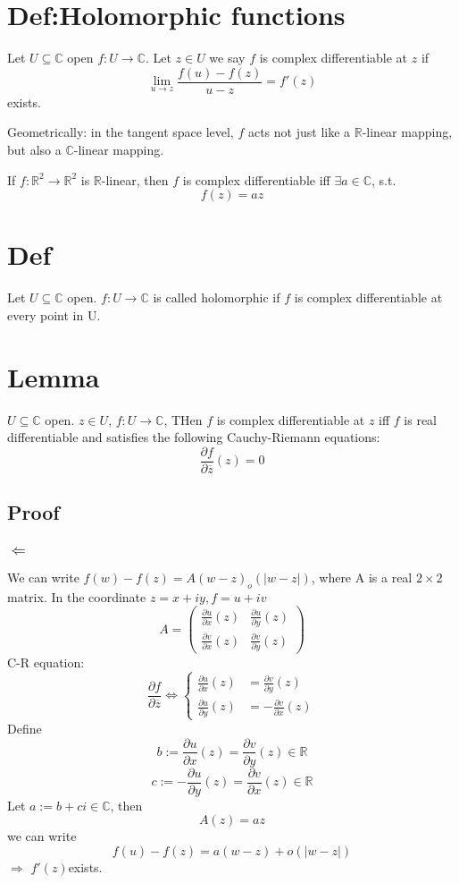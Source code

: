 \documentclass{book}
\newcommand{\abs}[1]{\left\lvert #1 \right\rvert}
\begin{document}
\section{Def:Holomorphic functions}
Let $U\subseteq \mathbb C$ open $f:U\rightarrow \mathbb C$. Let $z\in U$ we say $f$ is complex differentiable at $z$ if$$\lim\limits_{u\rightarrow z}\frac{f(u)-f(z)}{u-z}=f'(z)$$exists.

Geometrically: in the tangent space level, $f$ acts not just like a $\mathbb R$-linear mapping, but also a $\mathbb C$-linear mapping.

If $f:\mathbb R^2\rightarrow\mathbb R^2$ is $\mathbb R$-linear, then $f$ is complex differentiable iff $\exists a\in \mathbb C$, s.t.$$f(z)=az$$
\section{Def}
Let $U\subseteq \mathbb C$ open. $f:U\rightarrow \mathbb C$ is called holomorphic if $f$ is complex differentiable at every point in U.
\section{Lemma}
$U\subseteq \mathbb C$ open. $z\in U$, $f:U\rightarrow \mathbb C$, THen $f$ is complex differentiable at $z$ iff $f$ is real differentiable and satisfies the following Cauchy-Riemann equations:$$\frac{\partial f}{\partial \overline z}(z)=0$$
\subsection*{Proof}
\subsubsection{$\Leftarrow$} We can write $f(w)-f(z)=A(w-z)_o(\abs{w-z})$, where A is a real $2\times 2$ matrix. In the coordinate $z=x+iy,f=u+iv$$$A=\begin{pmatrix}
    \frac{\partial u}{\partial x}(z)&\frac{\partial u}{\partial y}(z)\\
    \frac{\partial v}{\partial x}(z)&\frac{\partial v}{\partial y}(z)
\end{pmatrix}$$
C-R equation:
$$\frac{\partial f}{\partial \overline z}\Leftrightarrow\begin{cases}
    \frac{\partial u}{\partial x}(z)&=\frac{\partial v}{\partial y}(z)\\
    \frac{\partial u}{\partial y}(z)&=-\frac{\partial v}{\partial x}(z)
\end{cases}$$
Define $$b:=\frac{\partial u}{\partial x}(z)=\frac{\partial v}{\partial y}(z)\in \mathbb R$$
$$c:=-\frac{\partial u}{\partial y}(z)=\frac{\partial v}{\partial x}(z)\in \mathbb R$$
Let $a:=b+ci\in \mathbb C$, then $$A(z)=az$$we can write$$f(u)-f(z)=a(w-z)+o(\abs{w-z})$$$\Rightarrow$ $f'(z)$exists.
\end{document}
